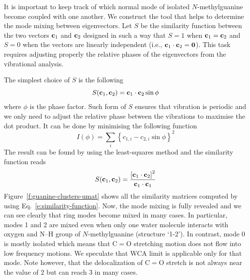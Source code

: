 \documentclass[b5paper,oneside,fleqn,11pt]{book}
\begin{document}
\begin{refsection}
It is important to keep track of which normal mode of isolated
$N$-methylguanine become coupled with one another.
We construct the tool that helps to determine
the mode mixing between eigenvectors.
Let $S$ be the similarity function between the two
vectors ${\bf c}_1$ and ${\bf c}_2$ designed in such a way that
$S=1$ when ${\bf c}_1={\bf c}_2$ and $S=0$ when the vectors
are linearly independent (i.e., ${\bf c}_1\cdot {\bf c}_2={\bf 0}$).
This task requires adjusting properly the relative phases
of the eigenvectors from the vibrational analysis.

The simplest choice of $S$ is the following
%
\begin{equation}  
  S({\bf c}_1,{\bf c}_2) = {\bf c}_1\cdot {\bf c}_2 \sin{\phi}
\end{equation}
%
where $\phi$ is the phase factor. Such form of $S$ ensures that
vibration is periodic and we only need to adjust the relative phase
between the vibrations to maximise the dot product.
It can be done by minimising the following function
%
\begin{equation}  
  I(\phi) = \sum_i \left\{ c_{1,i} - c_{2,i} \sin{\phi}\right\}^2
\end{equation}
%
The result can be found by using the least\hyp{}squares method
and the similarity function reads
%
\begin{equation}  \label{e:similarity-function}
  S({\bf c}_1,{\bf c}_2) = \frac{ \left[{\bf c}_1\cdot {\bf c}_2 \right]^2}{{\bf c}_1\cdot {\bf c}_1}
\end{equation}
%
Figure~\ref{f:guanine-clusters-umat} shows all the similarity
matrices computed by using Eq.~\eqref{e:similarity-function}. 
Now, the mode mixing is fully revealed and
we can see clearly that ring modes become mixed in many cases. 
In particular,
modes 1 and 2 are mixed even when only one water molecule
interacts with oxygen and N--H group of $N$-methylguanine (structure
`1-2'). In contrast, mode 0 is mostly
isolated which means that C$=$O stretching motion does not flow into
low frequency motions. We speculate that WCA limit is applicable only for that
mode. Note however, that the delocalization of C$=$O stretch is not always
near the value of 2 but can reach 3 in many cases. 
%
\begin{figure}[t!]
\centering
\setlength\fboxsep{0.4pt}
\setlength\fboxrule{0.5pt}
\fbox{
}
\end{figure}
\end{refsection}
\end{document}
